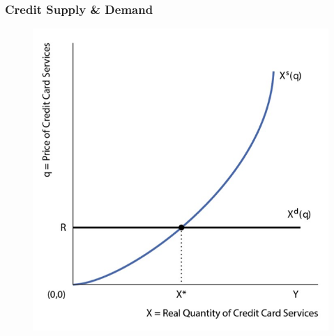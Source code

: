 \documentclass{beamer}
\begin{document}
\begin{frame}
\frametitle[alignment=center]{Credit Supply \& Demand}
\begin{figure}
\centering
\includegraphics[scale=0.65]{Figures/W_Fig_12pt4.png}
\end{figure}
\end{frame}
\end{document}
